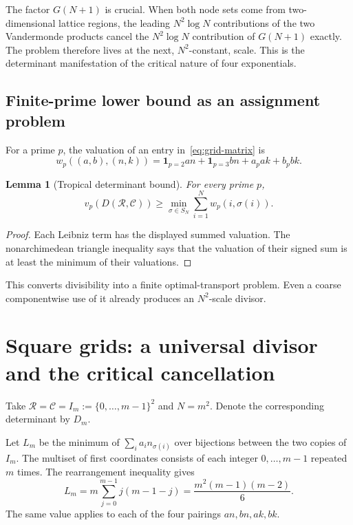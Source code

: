 \documentclass[11pt,oneside]{article}
\newtheorem{lemma}[theorem]{Lemma}
\theoremstyle{definition}
\theoremstyle{remark}
\begin{document}
The factor $G(N+1)$ is crucial.  When both node sets come from two-dimensional
lattice regions, the leading $N^2\log N$ contributions of the two Vandermonde
products cancel the $N^2\log N$ contribution of $G(N+1)$ exactly.  The problem
therefore lives at the next, $N^2$-constant, scale.  This is the determinant
manifestation of the critical nature of four exponentials.

\subsection{Finite-prime lower bound as an assignment problem}

For a prime $p$, the valuation of an entry in~\eqref{eq:grid-matrix} is
\begin{equation}\label{eq:valuation-cost}
 w_p((a,b),(n,k))
 =\mathbf1_{p=2}an+\mathbf1_{p=3}bn+a_p ak+b_p bk.
\end{equation}

\begin{lemma}[Tropical determinant bound]\label{lem:tropical}
For every prime $p$,
\[
 v_p(D(\mathcal R,\mathcal C))
 \ge \min_{\sigma\in S_N}\sum_{i=1}^N w_p(i,\sigma(i)).
\]
\end{lemma}
\begin{proof}
Each Leibniz term has the displayed summed valuation.  The nonarchimedean
triangle inequality says that the valuation of their signed sum is at least
the minimum of their valuations.
\end{proof}

This converts divisibility into a finite optimal-transport problem.  Even a
coarse componentwise use of it already produces an $N^2$-scale divisor.

\section{Square grids: a universal divisor and the critical cancellation}

Take $\mathcal R=\mathcal C=I_m:=\{0,\ldots,m-1\}^2$ and $N=m^2$.  Denote the
corresponding determinant by $D_m$.

Let $L_m$ be the minimum of $\sum_i a_i n_{\sigma(i)}$ over bijections between
the two copies of $I_m$.  The multiset of first coordinates consists of each
integer $0,\ldots,m-1$ repeated $m$ times.  The rearrangement inequality gives
\begin{equation}\label{eq:Lm}
 L_m=m\sum_{j=0}^{m-1}j(m-1-j)
 =\frac{m^2(m-1)(m-2)}6.
\end{equation}
The same value applies to each of the four pairings $an,bn,ak,bk$.
\end{document}
